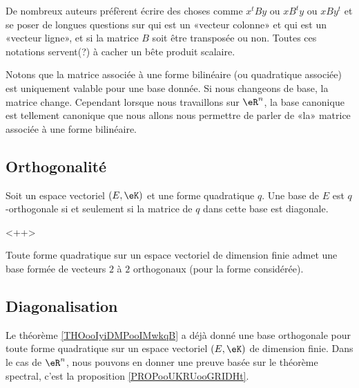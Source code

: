 De nombreux auteurs préfèrent écrire des choses comme \( x^tBy\) ou \( xB^ty\) ou \( xBy^t\) et se poser de longues questions sur qui est un «vecteur colonne» et qui est un «vecteur ligne», et si la matrice \( B\) soit être transposée ou non. Toutes ces notations servent(?) à cacher un bête produit scalaire.

Notons que la matrice associée à une forme bilinéaire (ou quadratique associée) est uniquement valable pour une base donnée. Si nous changeons de base, la matrice change. Cependant lorsque nous travaillons sur \( \eR^n\), la base canonique est tellement canonique que nous allons nous permettre de parler de «la» matrice associée à une forme bilinéaire.

\subsection{Orthogonalité}

\begin{proposition}
    Soit un espace vectoriel \( (E,\eK)\) et une forme quadratique \( q\). Une base de \( E\) est \( q\)-orthogonale si et seulement si la matrice de \( q\) dans cette base est diagonale.
\end{proposition}
<++>

\begin{theorem}       \label{THOooIyiDMPooIMwkqB}
    Toute forme quadratique sur un espace vectoriel de dimension finie admet une base formée de vecteurs \( 2\) à \( 2\) orthogonaux (pour la forme considérée).
\end{theorem}

\subsection{Diagonalisation}

Le théorème \ref{THOooIyiDMPooIMwkqB} a déjà donné une base orthogonale pour toute forme quadratique sur un espace vectoriel \( (E,\eK)\) de dimension finie. Dans le cas de \( \eR^n\), nous pouvons en donner une preuve basée sur le théorème spectral, c'est la proposition \ref{PROPooUKRUooGRIDHt}.

